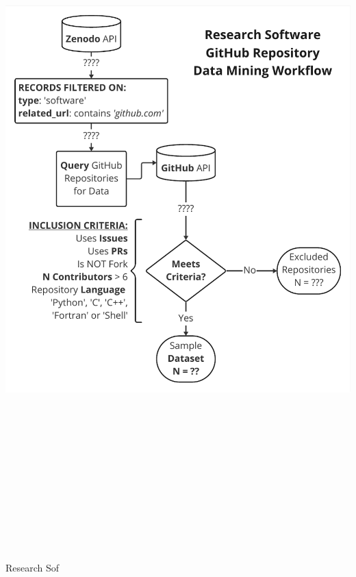 \documentclass[25pt, a0paper, landscape, margin=10mm, innermargin=15mm, blockverticalspace=10mm, subcolspace=7mm, dvipsnames]{tikzposter} %
\begin{document}
\begin{columns}
{\begin{multicols}{2}
{        %





        
        \begin{tikzfigure}
            \includegraphics[height=270mm]{Figures/epccposter - DataMiningWorkflow.pdf}
        \end{tikzfigure}

        Research Sof}
\end{multicols}}
\end{columns}
\end{document}
